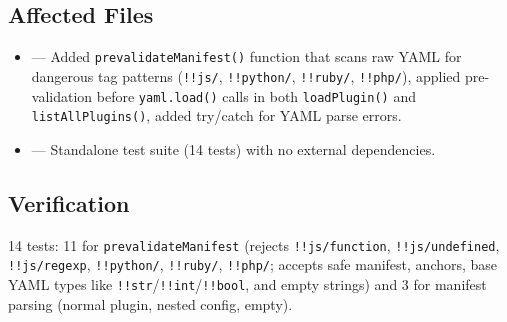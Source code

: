 \subsection*{Affected Files}
\begin{itemize}
    \item {} --- Added \texttt{prevalidateManifest()} function that scans raw YAML for dangerous tag patterns (\texttt{!!js/}, \texttt{!!python/}, \texttt{!!ruby/}, \texttt{!!php/}), applied pre-validation before \texttt{yaml.load()} calls in both \texttt{loadPlugin()} and \texttt{listAllPlugins()}, added try/catch for YAML parse errors.
    \item {} --- Standalone test suite (14 tests) with no external dependencies.
\end{itemize}

\subsection*{Verification}
14 tests: 11 for \texttt{prevalidateManifest} (rejects \texttt{!!js/function}, \texttt{!!js/undefined}, \texttt{!!js/regexp}, \texttt{!!python/}, \texttt{!!ruby/}, \texttt{!!php/}; accepts safe manifest, anchors, base YAML types like \texttt{!!str}/\texttt{!!int}/\texttt{!!bool}, and empty strings) and 3 for manifest parsing (normal plugin, nested config, empty).
